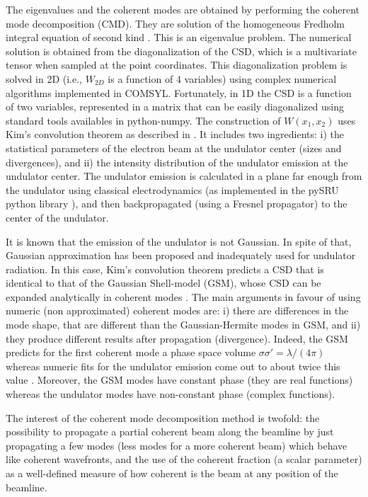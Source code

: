 \documentclass{iucr}              %
\begin{document}
The eigenvalues and the coherent modes are obtained by performing the coherent mode decomposition (CMD). They are solution of the homogeneous Fredholm integral equation of second kind \cite{glass2017}. This is an eigenvalue problem. The numerical solution is obtained from the diagonalization of the CSD, which is a multivariate tensor when sampled at the point coordinates. This diagonalization problem is solved in 2D (i.e., $W_{2D}$ is a function of 4 variables) using complex numerical algorithms implemented in COMSYL. Fortunately, in 1D the CSD is a function of two variables, represented in a matrix that can be easily diagonalized using standard tools availables in python-numpy. The construction of $W(x_1,x_2)$ uses Kim's convolution theorem \cite{kim1986b} as described in \cite{glass2017}. It includes two ingredients: i) the statistical parameters of the electron beam at the undulator center (sizes and divergences), and ii) the intensity distribution of the undulator emission at the undulator center. The undulator emission is calculated in a plane far enough from the undulator using classical electrodynamics \cite{jackson} (as implemented in the pySRU python library \cite{pySRU}), and then backpropagated (using a Fresnel propagator) to the center of the undulator. 

It is known that the emission of the undulator is not Gaussian. In spite of that, Gaussian approximation has been proposed \cite{coisson1997} and inadequately used for undulator radiation. In this case, Kim's convolution theorem predicts a CSD that is identical to that of the Gaussian Shell-model (GSM), whose CSD can be expanded analytically in coherent modes \cite{Starikov82}. The main arguments in favour of using numeric (non approximated) coherent modes are: i) there are differences in the mode shape, that are different than the Gaussian-Hermite modes in GSM, and ii) they produce different results after propagation (divergence). Indeed, the GSM predicts for the first coherent mode a phase space volume $\sigma \sigma'=\lambda/(4 \pi)$ whereas numeric fits for the undulator emission come out to about twice this value \cite{elleaume}. Moreover, the GSM modes have constant phase (they are real functions) whereas the undulator modes have non-constant phase (complex functions).

The interest of the coherent mode decomposition method is twofold: the possibility to propagate a partial coherent beam along the beamline by just propagating a few modes (less modes for a more coherent beam) which behave like coherent wavefronts, and the use of the coherent fraction (a scalar parameter) as a well-defined measure of how coherent is the beam at any position of the beamline.
\end{document}
